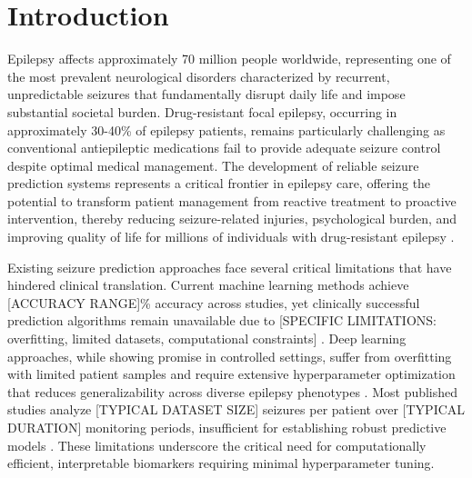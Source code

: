 
\section{Introduction}

Epilepsy affects approximately 70 million people worldwide, representing one of the most prevalent neurological disorders characterized by recurrent, unpredictable seizures that fundamentally disrupt daily life and impose substantial societal burden. Drug-resistant focal epilepsy, occurring in approximately 30-40\% of epilepsy patients, remains particularly challenging as conventional antiepileptic medications fail to provide adequate seizure control despite optimal medical management. The development of reliable seizure prediction systems represents a critical frontier in epilepsy care, offering the potential to transform patient management from reactive treatment to proactive intervention, thereby reducing seizure-related injuries, psychological burden, and improving quality of life for millions of individuals with drug-resistant epilepsy \cite{Kuhlmann2018SeizurePA,Freestone2015SeizurePSBF}.

Existing seizure prediction approaches face several critical limitations that have hindered clinical translation. Current machine learning methods achieve [ACCURACY RANGE]\% accuracy across studies, yet clinically successful prediction algorithms remain unavailable due to [SPECIFIC LIMITATIONS: overfitting, limited datasets, computational constraints] \cite{Natu2022ReviewOEB,Talukder2023ComparativeAOM}. Deep learning approaches, while showing promise in controlled settings, suffer from overfitting with limited patient samples and require extensive hyperparameter optimization that reduces generalizability across diverse epilepsy phenotypes \cite{Truong2021SeizureSPV,Dissanayake2020PatientindependentESY,KiralKornek2017EpilepticSPW}. Most published studies analyze [TYPICAL DATASET SIZE] seizures per patient over [TYPICAL DURATION] monitoring periods, insufficient for establishing robust predictive models \cite{Kuhlmann2018SeizurePA,DAlessandro2003EpilepticSPQ}. These limitations underscore the critical need for computationally efficient, interpretable biomarkers requiring minimal hyperparameter tuning.

